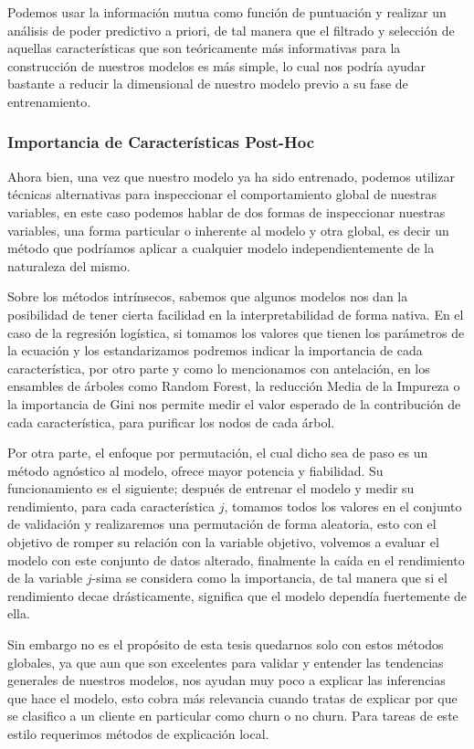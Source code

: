 Podemos usar la información mutua como función de puntuación y realizar un análisis de poder predictivo a priori, de tal manera que el filtrado y selección de aquellas características que son teóricamente más informativas para la construcción de nuestros modelos es más simple, lo cual nos podría ayudar bastante a reducir la dimensional de nuestro modelo previo a su fase de entrenamiento.

\subsubsection[Importancia de características]{Importancia de Características Post-Hoc}

Ahora bien, una vez que nuestro modelo ya ha sido entrenado, podemos utilizar técnicas alternativas para inspeccionar el comportamiento global de nuestras variables, en este caso podemos hablar de dos formas de inspeccionar nuestras variables, una forma particular o inherente al modelo y otra global, es decir un método que podríamos aplicar a cualquier modelo independientemente de la naturaleza del mismo. 

Sobre los métodos intrínsecos, sabemos que algunos modelos nos dan la posibilidad de tener cierta facilidad en la interpretabilidad  de forma nativa. En el caso de la regresión logística, si tomamos los valores que tienen los parámetros de la ecuación y los estandarizamos podremos indicar la importancia de cada característica, por otro parte y como lo mencionamos con antelación, en los ensambles de árboles como Random Forest, la reducción Media de la Impureza o la importancia de Gini nos permite medir el valor esperado de la contribución de cada característica, para purificar los nodos de cada árbol. 

Por otra parte, el enfoque por permutación, el cual dicho sea de paso es un método agnóstico al modelo, ofrece mayor potencia y fiabilidad. Su funcionamiento es el siguiente; después de entrenar el modelo y medir su rendimiento, para cada característica $j$, tomamos todos los valores en el conjunto de validación y realizaremos una permutación de forma aleatoria, esto con el objetivo de romper su relación con la variable objetivo, volvemos a evaluar el modelo con este conjunto de datos alterado, finalmente la caída en el rendimiento de la variable $j$-sima se considera como la importancia, de tal manera que si el rendimiento decae drásticamente, significa que el modelo dependía fuertemente de ella.

Sin embargo no es el propósito de esta tesis quedarnos solo con estos métodos globales, ya que aun que son excelentes para validar y entender las tendencias generales de nuestros modelos, nos ayudan muy poco a explicar las inferencias que hace el modelo, esto cobra más relevancia cuando tratas de explicar por que se clasifico a un cliente en particular como churn o no churn. Para tareas de este estilo requerimos métodos de explicación local.

